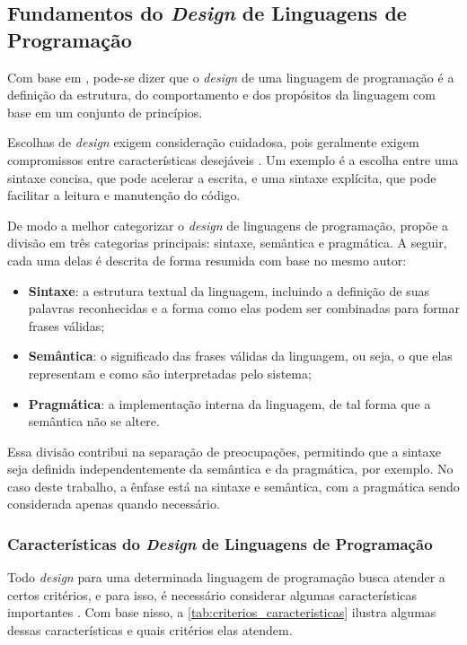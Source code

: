 \subsection{Fundamentos do \textit{Design} de Linguagens de Programação}

Com base em \cite{conceptsoflanguages}, pode-se dizer que o \textit{design} de uma linguagem de programação é a definição da estrutura, do comportamento e dos propósitos da linguagem com base em um conjunto de princípios.

Escolhas de \textit{design} exigem consideração cuidadosa, pois geralmente exigem compromissos entre características desejáveis \cite{conceptsoflanguages}. Um exemplo é a escolha entre uma sintaxe concisa, que pode acelerar a escrita, e uma sintaxe explícita, que pode facilitar a leitura e manutenção do código.

De modo a melhor categorizar o \textit{design} de linguagens de programação,  propõe a divisão em três categorias principais: sintaxe, semântica e pragmática. A seguir, cada uma delas é descrita de forma resumida com base no mesmo autor:

\begin{itemize}
	\item \textbf{Sintaxe}: a estrutura textual da linguagem, incluindo a definição de suas palavras reconhecidas e a forma como elas podem ser combinadas para formar frases válidas;

	\item \textbf{Semântica}: o significado das frases válidas da linguagem, ou seja, o que elas representam e como são interpretadas pelo sistema;

	\item \textbf{Pragmática}: a implementação interna da linguagem, de tal forma que a semântica não se altere.
\end{itemize}

Essa divisão contribui na separação de preocupações, permitindo que a sintaxe seja definida independentemente da semântica e da pragmática, por exemplo. No caso deste trabalho, a ênfase está na sintaxe e semântica, com a pragmática sendo considerada apenas quando necessário.

\subsubsection{Características do \textit{Design} de Linguagens de Programação}

Todo \textit{design} para uma determinada linguagem de programação busca atender a certos critérios, e para isso, é necessário considerar algumas características importantes \cite{conceptsoflanguages}. Com base nisso, a \autoref{tab:criterios_caracteristicas} ilustra algumas dessas características e quais critérios elas atendem.

